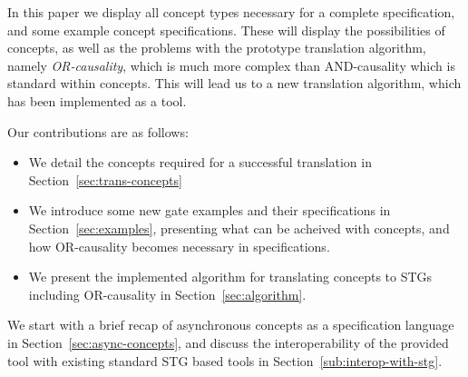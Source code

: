 \documentclass[british,conference,compsoc]{IEEEtran}
\newcommand{\noun}[1]{\textsc{#1}}
\begin{document}
In this paper we display all concept types necessary for a complete specification, and some 
example concept specifications. These will display the possibilities of concepts, as well as the 
problems with the prototype translation algorithm, namely \emph{OR-causality}, which is 
much more complex than AND-causality which is standard within concepts. 
This will lead us to a new translation algorithm, which has been implemented as a tool. 

Our contributions are as follows:
\begin{itemize}
  \item We detail the concepts required for a successful  
  translation in Section~\ref{sec:trans-concepts}
  \item We introduce some new gate examples and their specifications in
  Section~\ref{sec:examples}, presenting what can be acheived with
  concepts, and how OR-causality becomes necessary in specifications.
  \item We present the implemented algorithm for translating concepts to STGs
  including OR-causality in Section~\ref{sec:algorithm}.
\end{itemize}

\noindent
We start with a brief recap of asynchronous concepts as a specification language in
Section~\ref{sec:async-concepts}, and discuss the interoperability of the provided tool 
with existing standard STG based tools in Section~\ref{sub:interop-with-stg}.

\end{document}
